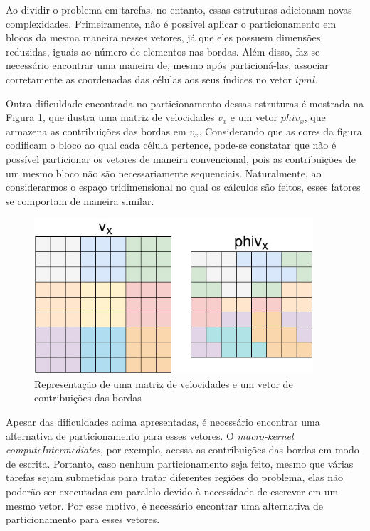 \documentclass[cic,tc]{iiufrgs}
\begin{document}
Ao dividir o problema em tarefas, no entanto, essas estruturas adicionam novas complexidades. Primeiramente, não é possível aplicar
o particionamento em blocos da mesma maneira nesses vetores, já que eles possuem dimensões reduzidas, iguais ao número de elementos
nas bordas. Além disso, faz-se necessário encontrar uma maneira de, mesmo após particioná-las, associar corretamente as coordenadas das células
aos seus índices no vetor $ipml$.

Outra dificuldade encontrada no particionamento dessas estruturas é mostrada na Figura \ref{fig:ipml}, que ilustra uma matriz de velocidades $v_x$
e um vetor $phiv_x$, que armazena as contribuições das bordas em $v_x$. Considerando que as cores da figura codificam o bloco ao qual cada célula
pertence, pode-se constatar que não é possível particionar os vetores de maneira convencional, pois as contribuições de um
mesmo bloco não são necessariamente sequenciais. Naturalmente, ao considerarmos o espaço tridimensional no qual os cálculos são feitos,
esses fatores se comportam de maneira similar.

\begin{figure}[!htb]
    \caption{Representação de uma matriz de velocidades e um vetor de contribuições das bordas}
    \begin{center}
      \includegraphics[width=28em]{ipml}
    \end{center}
    \label{fig:ipml}
\end{figure}

Apesar das dificuldades acima apresentadas, é necessário encontrar uma alternativa de particionamento para esses vetores. O \textit{macro-kernel
  computeIntermediates}, por exemplo, acessa as contribuições das bordas em modo de escrita. Portanto, caso
nenhum particionamento seja feito, mesmo que várias tarefas sejam submetidas para tratar diferentes regiões do problema, elas
não poderão ser executadas em paralelo devido à necessidade de escrever em um mesmo vetor. Por esse motivo, é necessário encontrar
uma alternativa de particionamento para esses vetores.
\end{document}
